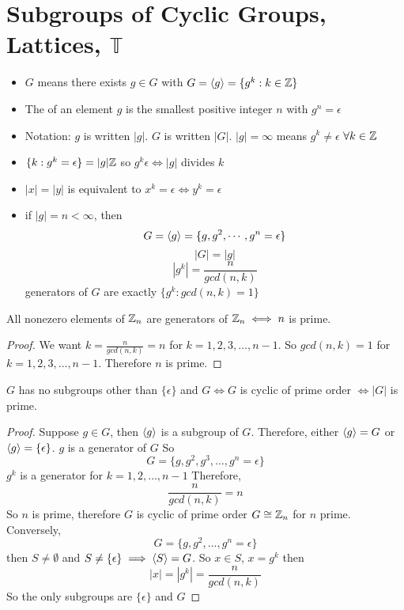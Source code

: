\documentclass[openany]{report}
\begin{document}
\chapter{Subgroups of Cyclic Groups, Lattices, $\mathbb{T}$}
\begin{itemize}
    \item $G$  means there exists $g \in G$ with $G = \langle g \rangle = \{g^k : k \in \mathbb{Z}\}$
    \item The  of an element $g$ is the smallest positive integer $n$ with $g^n = \epsilon$
    \item Notation:  $g$ is written $|g|$.  $G$ is written $|G|$. $|g| = \infty$ means $g^k \neq \epsilon$ $\forall k \in \mathbb{Z}$
    \item $\{k: g^k = \epsilon\} = |g|\mathbb{Z}$ so $g^k \epsilon \iff |g|$ divides $k$
    \item $|x| = |y|$ is equivalent to $x^k = \epsilon \iff y^k = \epsilon$
    \item if $|g| = n < \infty$, then
    $$G = \langle g \rangle = \{g,g^2,\cdots, g^n = \epsilon\}$$
    $$|G| = |g|$$
    $$|g^k| = \frac{n}{gcd(n,k)}$$
    generators of $G $ are exactly $\{g^k: gcd(n,k) = 1\}$
\end{itemize}
\begin{corollary}
    All nonezero elements of $\mathbb{Z}_n$ are generators of $\mathbb{Z}_n \iff n$ is prime.
\end{corollary}
\begin{proof}
    We want $k = \frac{n}{gcd(n,k)} = n$ for $k = 1,2,3,\dots, n-1$. So $gcd(n,k) = 1$ for $k = 1,2,3,\dots, n-1$. Therefore $n$ is prime.
\end{proof}
\begin{theorem}
    $G$ has no subgroups other than $ \{\epsilon\}$ and $G \iff G$ is cyclic of prime order $\iff |G|$ is prime. 
\end{theorem}
\begin{proof}
    Suppose $g \in G$, then $\langle g \rangle$ is a subgroup of $G$. Therefore, either $\langle g \rangle = G$ or $\langle g \rangle = \{\epsilon\}$. $g$ is a generator of $G$ 
    So 
    $$G = \{g,g^2,g^3, \dots, g^n = \epsilon\}$$
    $g^k$ is a generator for $k = 1,2, \dots, n-1$
    Therefore, 
    $$\frac{n}{gcd(n,k)} = n$$
    So $n$ is prime, therefore $G$ is cyclic of prime order $G \cong \mathbb{Z}_n$ for $n$ prime.\\[2ex]
    Conversely,
    $$G = \{g, g^2, \dots, g^n = \epsilon\}$$
    then $S \neq \emptyset$ and $S \neq \{\epsilon\} \implies \langle S \rangle = G$. So $x \in S$, $x = g^k$ then 
    $$|x| = |g^k| = \frac{n}{gcd(n,k)}$$
    So the only subgroups are $\{\epsilon\}$ and $G$
\end{proof}
\end{document}
